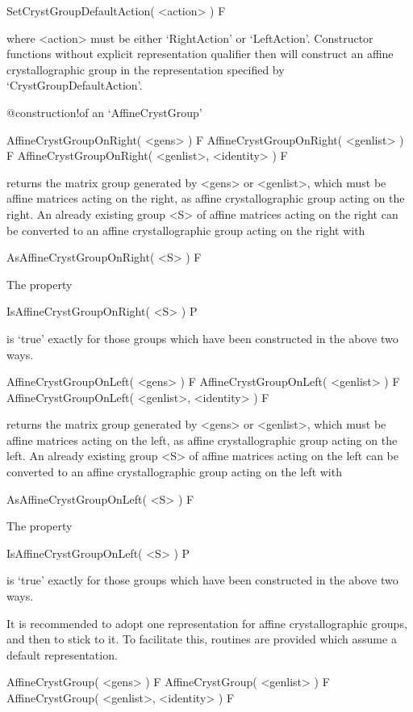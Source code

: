 \> SetCrystGroupDefaultAction( <action> ) F

where <action> must be either `RightAction' or `LeftAction'.
Constructor functions without explicit representation
qualifier then will construct an affine crystallographic group
in the representation specified by `CrystGroupDefaultAction'.



%
{@construction!of an \noexpand`AffineCrystGroup'}

\> AffineCrystGroupOnRight( <gens> ) F
\> AffineCrystGroupOnRight( <genlist> ) F
\> AffineCrystGroupOnRight( <genlist>, <identity> ) F

returns the matrix group generated by <gens> or <genlist>, which must
be affine matrices acting on the right, as affine crystallographic
group acting on the right. An already existing group <S> of affine
matrices acting on the right can be converted to an affine
crystallographic group acting on the right with

\>AsAffineCrystGroupOnRight( <S> ) F

The property

\>IsAffineCrystGroupOnRight( <S> ) P

is `true' exactly for those groups which have been constructed in the 
above two ways.

\>AffineCrystGroupOnLeft( <gens> ) F
\>AffineCrystGroupOnLeft( <genlist> ) F
\>AffineCrystGroupOnLeft( <genlist>, <identity> ) F

returns the matrix group generated by <gens> or <genlist>, which must
be affine matrices acting on the left, as affine crystallographic
group acting on the left. An already existing group <S> of affine
matrices acting on the left can be converted to an affine
crystallographic group acting on the left with

\>AsAffineCrystGroupOnLeft( <S> ) F

The property

\>IsAffineCrystGroupOnLeft( <S> ) P

is `true' exactly for those groups which have been constructed in the 
above two ways.

It is recommended to adopt one representation for affine
crystallographic groups, and then to stick to it. To facilitate
this, routines are provided which assume a default representation.

\>AffineCrystGroup( <gens> ) F
\>AffineCrystGroup( <genlist> ) F
\>AffineCrystGroup( <genlist>, <identity> ) F

